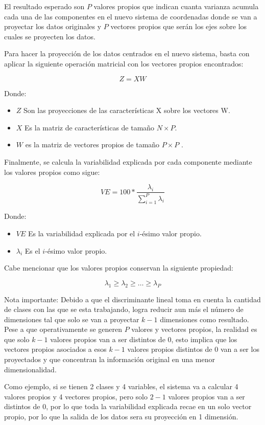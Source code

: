 \documentclass[11pt, letterpaper]{article}
\begin{document}
El resultado esperado son $P$ valores propios que indican cuanta varianza acumula cada una de las componentes en el nuevo sistema de coordenadas donde se van a proyectar los datos originales y $P$ vectores propios que serán los ejes sobre los cuales se proyecten los datos.

Para hacer la proyección de los datos centrados en el nuevo sistema, basta con aplicar la siguiente operación matricial con los vectores propios encontrados:

$$Z = XW$$

Donde: 
\begin{itemize}
	\item $Z$ Son las proyecciones de las características X sobre los vectores W.
	\item $X$ Es la matriz de características de tamaño $N \times P$.
	\item $W$ es la matriz de vectores propios de tamaño $P \times P$ .
\end{itemize}

Finalmente, se calcula la variabilidad explicada por cada componente mediante los valores propios como sigue:

$$VE = 100*\frac{\lambda_i}{\sum_{i = 1}^P{\lambda_i}}$$

Donde: 
\begin{itemize}
	\item $VE$ Es la variabilidad explicada por el $i$-ésimo valor propio.
	\item $\lambda_i$ Es el $i$-ésimo valor propio.
\end{itemize}

Cabe mencionar que los valores propios conservan la siguiente propiedad:

$$\lambda_1 \geq \lambda_2 \geq \dots \geq \lambda_P$$

Nota importante: Debido a que el discriminante lineal toma en cuenta la cantidad de clases con las que se esta trabajando, logra reducir aun más el número de dimensiones tal que solo se van a proyectar $k-1$ dimensiones como resultado.
Pese a que operativamente se generen $P$ valores y vectores propios, la realidad es que solo $k-1$ valores propios van a ser distintos de 0, esto implica que los  vectores propios asociados a esos $k-1$ valores propios distintos de 0 van a ser los proyectados y que concentran la información original en una menor dimensionalidad.

Como ejemplo, si se tienen 2 clases y 4 variables, el sistema va a calcular 4 valores propios y 4 vectores propios, pero solo $2-1$ valores propios van a ser distintos de 0, por lo que toda la variabilidad explicada recae en un solo vector propio, por lo que la salida de los datos sera su proyección en 1 dimensión.
\end{document}
